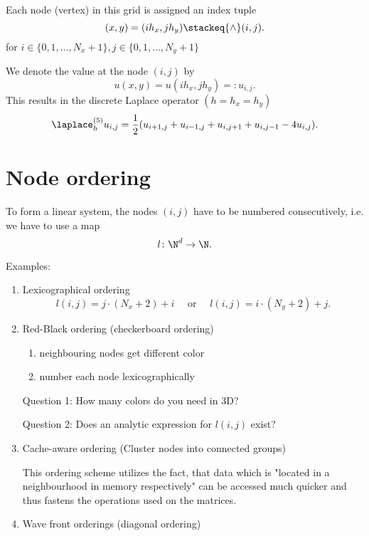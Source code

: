
Each node (vertex) in this grid is assigned an index tuple
\[
	(x,y) = (ih_{x}, jh_{y}) \stackeq{\wedge} (i,j)
.\] 
for $i \in \{0,1, \ldots , N_{x}+1\}, j \in  \{0,1, \ldots , N_{y}+1\}$

We denote the value at the node $(i,j)$ by
\[
	u(x,y)=u(ih_{x},jh_{y})=:u_{i,j}
.\] 
This results in the discrete Laplace operator $(h=h_{x}=h_{y})$
\[
	\laplace_{h}^{(5)}u_{i,j}=\frac{1}{2}(u_{i+1,j}+u_{i-1,j} +u_{i,j+1}+ u_{i,j-1} - 4u_{i,j})
.\]

\section{Node ordering}%
\label{sec:Node ordering}
To form a linear system, the nodes $(i,j)$ have to be numbered consecutively, i.e. we have to use a map
\[
	l\colon \N^{d} \rightarrow \N
.\] 

Examples:

\begin{enumerate}[label=\alph{enumi})]
	\item  Lexicographical ordering
		\[
			l(i,j) = j \cdot (N_{x} + 2) + i 
			\quad\text{ or }\quad
			l(i,j) = i \cdot (N_{y} + 2) + j
		.\] 

	\item Red-Black ordering (checkerboard ordering)

		\begin{enumerate}[label=\arabic{enumii})]
			\item neighbouring nodes get different color
			\item number each node lexicographically
		\end{enumerate}


		Question 1: How many colors do you need in 3D?

		Question 2: Does an analytic expression for $l(i,j)$ exist?
	\item Cache-aware ordering (Cluster nodes into connected groups)

		
		This ordering scheme utilizes the fact, that data which is "located in a neighbourhood in memory respectively" can be accessed much quicker and thus fastens the operations used on the matrices.

	\item Wave front orderings (diagonal ordering)

\end{enumerate}


